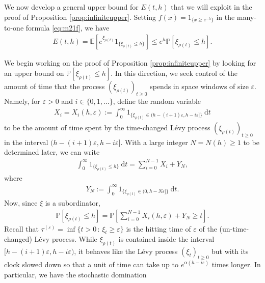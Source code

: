 \documentclass[a4,12pt]{amsart}
\numberwithin{equation}{section}
\begin{document}
	We now develop a general upper bound for $E(t,h)$ that we will exploit in the 
	proof of Proposition \ref{prop:infiniteupper}.
	Setting $f(x) = \mathrm{1}_{\{ x \geq e^{- h} \}}$ in the 
	many-to-one formula \eqref{eq:m21f}, we have 
	\begin{align*} 
		E(t,h)
		= \mathbb{E}\left[ e^{ \xi_{\rho(t)} } \mathrm{1}_{\{ \xi_{\rho(t)} \leq h \}} \right] 
		\leq e^h \mathbb{P}\left[ \xi_{\rho(t)} \leq h \right].
	\end{align*}

We begin working on the proof of Proposition \ref{prop:infiniteupper} by looking for an 
upper bound on $\mathbb{P}\left[ \xi_{\rho(t)} \leq h \right]$. In this direction, we seek control of the amount of time that the process $(\xi_{\rho(t)})_{t \geq 0}$ spends in space windows of size $\varepsilon$. Namely, for $\varepsilon > 0$ and $i \in \{0,1,\ldots\}$, define the random variable 
		 \begin{align*}
			X_i = X_i(h,\varepsilon) 
			:= \int_0^\infty \mathrm{1}_{\{ \xi_{\rho(t)} \in (h-(i+1)\varepsilon, h - i \varepsilon ]  \}}~ \mathrm{d}t
		\end{align*}
		to be the amount of time spent by the time-changed L\'evy
		process $(\xi_{\rho(t)})_{t \geq 0}$ in the interval $(h-(i+1)\varepsilon,h-i\varepsilon]$. 
		With a large integer $N=N(h) \geq 1$ to be determined later, we can write
		\begin{align*}
			\int_0^\infty \mathrm{1}_{\{ \xi_{\rho(t)} \leq h  \}}~ \mathrm{d}t
			= \sum_{ i =0}^{N-1} X_i + Y_N,
		\end{align*}
		where 
		\begin{align*}
			Y_N := \int_0^\infty \mathrm{1}_{\{ \xi_{\rho(t)} \in (0, h - N  \varepsilon ]  \}}~ \mathrm{d}t.
		\end{align*}
		Now, since $\xi$ is a subordinator,
		\begin{align*}
			\mathbb{P}\left[ \xi_{\rho(t)} \leq h \right]
			= \mathbb{P}\left[ \sum_{i = 0}^{N-1} X_i(h,\varepsilon) + Y_N  \geq  t \right].
		\end{align*}
		Recall that $\tau^{(\varepsilon)} = \inf \{ t > 0 \,:\, \xi_t \geq \varepsilon \}$ is the hitting time of $\varepsilon$ of the (un-time-changed) L\'evy process.
		While $\xi_{\rho(t)}$ is contained inside the interval 
		$[h-(i+1)\varepsilon,h-i\varepsilon)$, it behaves like the L\'evy process 
		$(\xi_t)_{t \geq 0}$ but with its clock slowed down so that a unit of time can take up to $e^{\alpha(h-i\varepsilon)}$ times longer. In particular, we have the stochastic domination
\end{document}
